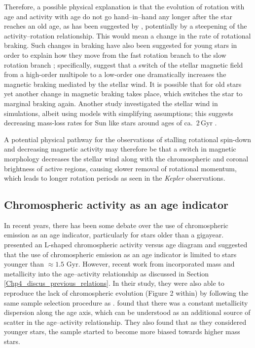 Therefore, a possible physical explanation is that the evolution of rotation with age and activity with age do not go hand--in--hand any longer after the star reaches an old age, as has been suggested by \citet{Booth_etal_2017}, potentially by a steepening of the activity--rotation relationship. This would mean a change in the rate of rotational braking. Such changes in braking have also been suggested for young stars in order to explain how they move from the fast rotation branch to the slow rotation branch \citep{Garraffo_etal_2015, Garraffo_etal_2018}; specifically, \citet{Garraffo_etal_2016} suggest that a switch of the stellar magnetic field from a high-order multipole to a low-order one dramatically increases the magnetic braking mediated by the stellar wind. It is possible that for old stars yet another change in magnetic braking takes place, which switches the star to marginal braking again. Another study investigated the stellar wind in simulations, albeit using models with simplifying assumptions; this suggests decreasing mass-loss rates for Sun like stars around ages of ca.\ 2\,Gyr \citep{OFionnagain_Vidotto_2018}.

A potential physical pathway for the observations of stalling rotational spin-down and decreasing magnetic activity may therefore be that a switch in magnetic morphology decreases the stellar wind along with the chromospheric and coronal brightness of active regions, causing slower removal of rotational momentum, which leads to longer rotation periods as seen in the \textit{Kepler} observations.

\subsection{Chromospheric activity as an age indicator}

In recent years, there has been some debate over the use of chromospheric emission as an age indicator, particularly for stars older than a gigayear. \citet{Pace_2013} presented an L-shaped chromospheric activity versus age diagram and suggested that the use of chromospheric emission as an age indicator is limited to stars younger than $\approx 1.5$ Gyr. However, recent work from \citet{Lorenzo_Oliveira_etal_2016} incorporated mass and metallicity into the age--activity relationship as discussed in Section \ref{Chp4_discus_previous_relations}. In their study, they were also able to reproduce the lack of chromospheric evolution (Figure 2 within) by following the same sample selection procedure as \citet{Pace_2013}. \citet{Lorenzo_Oliveira_etal_2016} found that there was a constant metallicity dispersion along the age axis, which can be understood as an additional source of scatter in the age--activity relationship. They also found that as they considered younger stars, the sample started to become more biased towards higher mass stars.

